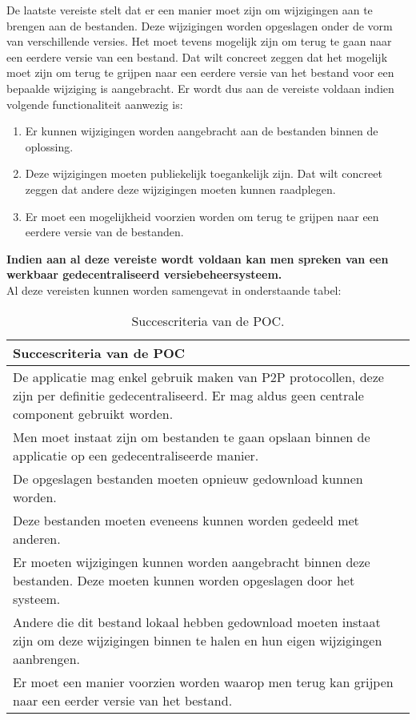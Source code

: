 De laatste vereiste stelt dat er een manier moet zijn om wijzigingen aan te brengen aan de bestanden. Deze wijzigingen worden opgeslagen onder de vorm van verschillende versies. Het moet tevens mogelijk zijn om terug te gaan naar een eerdere versie van een bestand. Dat wilt concreet zeggen dat het mogelijk moet zijn om terug te grijpen naar een eerdere versie van het bestand voor een bepaalde wijziging is aangebracht. Er wordt dus aan de vereiste voldaan indien volgende functionaliteit aanwezig is:

\begin{enumerate}
\item Er kunnen wijzigingen worden aangebracht aan de bestanden binnen de oplossing.
\item Deze wijzigingen moeten publiekelijk toegankelijk zijn. Dat wilt concreet zeggen dat andere deze wijzigingen moeten kunnen raadplegen.
\item Er moet een mogelijkheid voorzien worden om terug te grijpen naar een eerdere versie van de bestanden. 
\end{enumerate}

\textbf{Indien aan al deze vereiste wordt voldaan kan men spreken van een werkbaar gedecentraliseerd versiebeheersysteem.}\\

Al deze vereisten kunnen worden samengevat in onderstaande tabel:
\begin{table}[h!]
	\centering
	\begin{tabular}{ |p{14cm}|}
 		\hline
 		\large \textbf{Succescriteria van de POC} \\
 		\hline
 		De applicatie mag enkel gebruik maken van P2P protocollen, deze zijn per definitie gedecentraliseerd. Er mag aldus geen centrale component gebruikt worden.\\
 		\hline 
 		Men moet instaat zijn om bestanden te gaan opslaan binnen de applicatie op een gedecentraliseerde manier.\\
 		\hline
 		De opgeslagen bestanden moeten opnieuw gedownload kunnen worden.\\
 		\hline
		Deze bestanden moeten eveneens kunnen worden gedeeld met anderen.\\
 		\hline
 		Er moeten wijzigingen kunnen worden aangebracht binnen deze bestanden. Deze moeten kunnen worden opgeslagen door het systeem.\\
 		\hline
 		Andere die dit bestand lokaal hebben gedownload moeten instaat zijn om deze wijzigingen binnen te halen en hun eigen wijzigingen aanbrengen.\\
 		\hline
 		Er moet een manier voorzien worden waarop men terug kan grijpen naar een eerder versie van het bestand.\\
 		\hline
 	\end{tabular}
	\label{tbl_concepts}
	\caption{Succescriteria van de POC.}
\end{table}
\newpage
